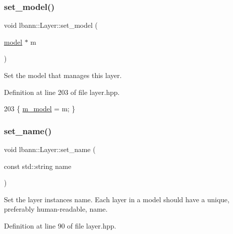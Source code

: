 \subsubsection{\texorpdfstring{set\+\_\+model()}{set\_model()}}
{\footnotesize\ttfamily void lbann\+::\+Layer\+::set\+\_\+model (\begin{DoxyParamCaption}\item[{\hyperlink{classlbann_1_1model}{model} $\ast$}]{m }\end{DoxyParamCaption})\hspace{0.3cm}{\ttfamily [inline]}}

Set the model that manages this layer. 

Definition at line 203 of file layer.\+hpp.


\begin{DoxyCode}
203 \{ \hyperlink{classlbann_1_1Layer_a3d9315e99574166f2f33e37b572021d2}{m\_model} = m; \}
\end{DoxyCode}
\mbox{\label{classlbann_1_1Layer_a82d8a038861b0af0d54fbf44ce715839}} 
\subsubsection{\texorpdfstring{set\+\_\+name()}{set\_name()}}
{\footnotesize\ttfamily void lbann\+::\+Layer\+::set\+\_\+name (\begin{DoxyParamCaption}\item[{const std\+::string}]{name }\end{DoxyParamCaption})\hspace{0.3cm}{\ttfamily [inline]}}

Set the layer instance\textquotesingle{}s name. Each layer in a model should have a unique, preferably human-\/readable, name. 

Definition at line 90 of file layer.\+hpp.


